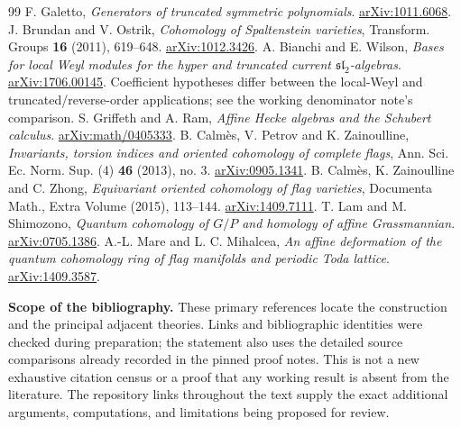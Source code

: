 \begin{thebibliography}{99}
 F. Galetto, \emph{Generators of truncated symmetric polynomials}. \href{https://arxiv.org/abs/1011.6068}{arXiv:1011.6068}.
 J. Brundan and V. Ostrik, \emph{Cohomology of Spaltenstein varieties}, Transform. Groups \textbf{16} (2011), 619--648. \href{https://arxiv.org/abs/1012.3426}{arXiv:1012.3426}.
 A. Bianchi and E. Wilson, \emph{Bases for local Weyl modules for the hyper and truncated current $\mathfrak{sl}_2$-algebras}. \href{https://arxiv.org/abs/1706.00145}{arXiv:1706.00145}. Coefficient hypotheses differ between the local-Weyl and truncated/reverse-order applications; see the working denominator note's comparison.
 S. Griffeth and A. Ram, \emph{Affine Hecke algebras and the Schubert calculus}. \href{https://arxiv.org/abs/math/0405333}{arXiv:math/0405333}.
 B. Calm\`es, V. Petrov and K. Zainoulline, \emph{Invariants, torsion indices and oriented cohomology of complete flags}, Ann. Sci. Ec. Norm. Sup. (4) \textbf{46} (2013), no. 3. \href{https://arxiv.org/abs/0905.1341}{arXiv:0905.1341}.
 B. Calm\`es, K. Zainoulline and C. Zhong, \emph{Equivariant oriented cohomology of flag varieties}, Documenta Math., Extra Volume (2015), 113--144. \href{https://arxiv.org/abs/1409.7111}{arXiv:1409.7111}.
 T. Lam and M. Shimozono, \emph{Quantum cohomology of $G/P$ and homology of affine Grassmannian}. \href{https://arxiv.org/abs/0705.1386}{arXiv:0705.1386}.
 A.-L. Mare and L. C. Mihalcea, \emph{An affine deformation of the quantum cohomology ring of flag manifolds and periodic Toda lattice}. \href{https://arxiv.org/abs/1409.3587}{arXiv:1409.3587}.
\end{thebibliography}
\noindent\textbf{Scope of the bibliography.} These primary references locate the construction and the principal adjacent theories. Links and bibliographic identities were checked during preparation; the statement also uses the detailed source comparisons already recorded in the pinned proof notes. This is not a new exhaustive citation census or a proof that any working result is absent from the literature. The repository links throughout the text supply the exact additional arguments, computations, and limitations being proposed for review.
